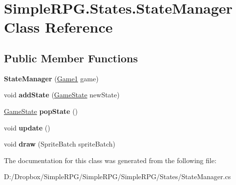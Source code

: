 \hypertarget{class_simple_r_p_g_1_1_states_1_1_state_manager}{\section{Simple\+R\+P\+G.\+States.\+State\+Manager Class Reference}
\label{class_simple_r_p_g_1_1_states_1_1_state_manager}
}
\subsection*{Public Member Functions}
\begin{DoxyCompactItemize}
\item 
\hypertarget{class_simple_r_p_g_1_1_states_1_1_state_manager_a190d4de26a1b06b94cf488a124fd407d}{{\bfseries State\+Manager} (\hyperlink{class_simple_r_p_g_1_1_game1}{Game1} game)}\label{class_simple_r_p_g_1_1_states_1_1_state_manager_a190d4de26a1b06b94cf488a124fd407d}

\item 
\hypertarget{class_simple_r_p_g_1_1_states_1_1_state_manager_ae5698b19b0cf74dec089f2217bbb7b94}{void {\bfseries add\+State} (\hyperlink{class_simple_r_p_g_1_1_states_1_1_game_state}{Game\+State} new\+State)}\label{class_simple_r_p_g_1_1_states_1_1_state_manager_ae5698b19b0cf74dec089f2217bbb7b94}

\item 
\hypertarget{class_simple_r_p_g_1_1_states_1_1_state_manager_a082635e320668aeb0b4e386c00e26b95}{\hyperlink{class_simple_r_p_g_1_1_states_1_1_game_state}{Game\+State} {\bfseries pop\+State} ()}\label{class_simple_r_p_g_1_1_states_1_1_state_manager_a082635e320668aeb0b4e386c00e26b95}

\item 
\hypertarget{class_simple_r_p_g_1_1_states_1_1_state_manager_a087db2b322e7df7dd718fe9bfa8de005}{void {\bfseries update} ()}\label{class_simple_r_p_g_1_1_states_1_1_state_manager_a087db2b322e7df7dd718fe9bfa8de005}

\item 
\hypertarget{class_simple_r_p_g_1_1_states_1_1_state_manager_a79b249bd1e60b228ad9666b02b6308cf}{void {\bfseries draw} (Sprite\+Batch sprite\+Batch)}\label{class_simple_r_p_g_1_1_states_1_1_state_manager_a79b249bd1e60b228ad9666b02b6308cf}

\end{DoxyCompactItemize}


The documentation for this class was generated from the following file\+:\begin{DoxyCompactItemize}
\item 
D\+:/\+Dropbox/\+Simple\+R\+P\+G/\+Simple\+R\+P\+G/\+Simple\+R\+P\+G/\+States/State\+Manager.\+cs\end{DoxyCompactItemize}
